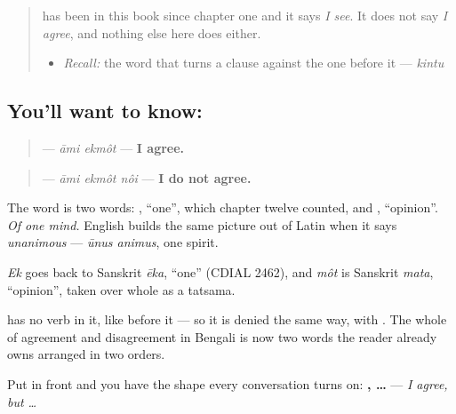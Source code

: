 \label{lesson:BN-C18-ekmot}



\begin{quote}
\textbf{} has been in this book since chapter one and it says \emph{I see}. It does not say \emph{I agree}, and nothing else here does either.

\begin{itemize}
\raggedright
  \item \emph{Recall:} the word that turns a clause against the one before it — \emph{kintu}
\end{itemize}
\end{quote}

\subsection*{You'll want to know: }
\begin{quote}
\textbf{ } — \emph{āmi ekmôt} — \textbf{I agree.}
\end{quote}

\begin{quote}
\textbf{  } — \emph{āmi ekmôt nôi} — \textbf{I do not agree.}
\end{quote}

The word is two words: \textbf{}, \textquotedblleft{}one\textquotedblright{}, which chapter twelve counted, and \textbf{}, \textquotedblleft{}opinion\textquotedblright{}. \emph{Of one mind.} English builds the same picture out of Latin when it says \emph{unanimous} — \emph{ūnus animus}, one spirit.

\begin{cousinweb}
\emph{Ek} goes back to Sanskrit \emph{ēka}, \textquotedblleft{}one\textquotedblright{} (CDIAL 2462), and \emph{môt} is Sanskrit \emph{mata}, \textquotedblleft{}opinion\textquotedblright{}, taken over whole as a tatsama.
\end{cousinweb}

\begin{grammarlens}[title={Grammar Lens: agreeing needs no verb, and disagreeing needs no new word}]
\textbf{ } has no verb in it, like \textbf{ } before it — so it is denied the same way, with \textbf{}. The whole of agreement and disagreement in Bengali is now two words the reader already owns arranged in two orders.

Put \textbf{} in front and you have the shape every conversation turns on: \textbf{ ,  …} — \emph{I agree, but …}
\end{grammarlens}

